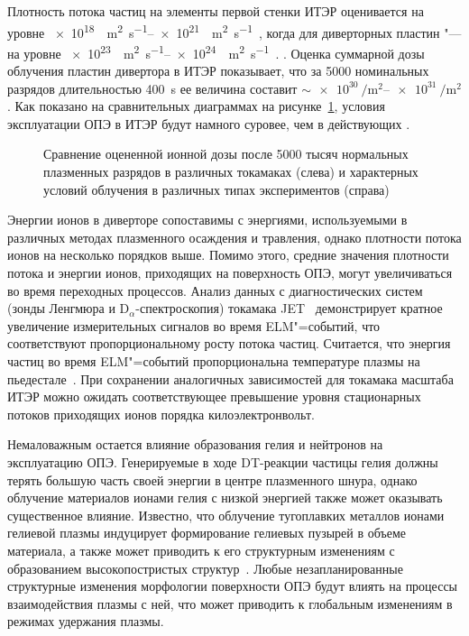 Плотность потока частиц на элементы первой стенки ИТЭР оценивается на уровне \SIrange{e18}{e21}{\per\metre\squared\per\second}~\cite{DeTemmerman2021, Rivals2022}, когда для диверторных пластин "--- на уровне \SIrange{e23}{e24}{\per\metre\squared\per\second}~\cite{Pitts2019,Orrico2023}. . Оценка суммарной дозы облучения пластин дивертора в ИТЭР показывает, что за 5000 номинальных разрядов длительностью \SI{400}{\second} ее величина составит \( \sim \SIrange{e30}{e31}{\per\metre\squared} \). Как показано на сравнительных диаграммах на рисунке~\cref{fig:ch1/fluxes_comparison}, условия эксплуатации ОПЭ в ИТЭР будут намного суровее, чем в действующих .
\begin{figure}[ht]
    \caption{Сравнение оцененной ионной дозы после 5000 тысяч нормальных плазменных разрядов в различных токамаках (слева) и характерных условий облучения в различных типах экспериментов (справа)~\cite{DeTemmerman2018}}\label{fig:ch1/fluxes_comparison}
\end{figure}
Энергии ионов в диверторе сопоставимы с энергиями, используемыми в различных методах плазменного осаждения и травления, однако плотности потока ионов на несколько порядков выше. Помимо этого, средние значения плотности потока и энергии ионов, приходящих на поверхность ОПЭ, могут увеличиваться во время переходных процессов. Анализ данных с диагностических систем (зонды Ленгмюра и \(\mathrm{D}_\alpha\)-спектроскопия) токамака JET~\cite{Guillemaut2015,Guillemaut2018} демонстрирует кратное увеличение измерительных сигналов во время ELM"=событий, что соответствуют пропорциональному росту потока частиц. Считается, что энергия частиц во время ELM"=событий пропорциональна температуре плазмы на пьедестале~\cite{Eich2017}. При сохранении аналогичных зависимостей для токамака масштаба ИТЭР можно ожидать соответствующее превышение уровня стационарных потоков  приходящих ионов порядка килоэлектронвольт.

Немаловажным остается влияние образования гелия и нейтронов на эксплуатацию ОПЭ. Генерируемые в ходе DT-реакции частицы гелия должны терять большую часть своей энергии в центре плазменного шнура, однако облучение материалов ионами гелия с низкой энергией также может оказывать существенное влияние. Известно, что облучение тугоплавких металлов ионами гелиевой плазмы индуцирует формирование гелиевых пузырей в объеме материала, а также может приводить к его структурным изменениям с образованием высокопостристых структур~\cite{Ueda2018,Kajita2018,Fedorovich2019}. Любые незапланированные структурные изменения морфологии поверхности ОПЭ будут влиять на процессы взаимодействия плазмы с ней, что может приводить к глобальным изменениям в режимах удержания плазмы.

